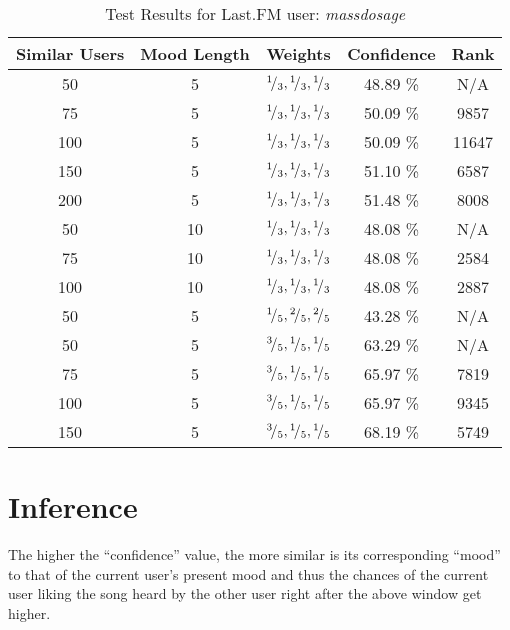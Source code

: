 \begin{table}[h!]
\centering
\begin{tabular}{ | c | c | c || c | c | }
\hline
Similar Users	& Mood Length	& Weights							&Confidence	&Rank\\
\hline \hline
50			& 5			& \({}^{1}\!/_{3}, {}^{1}\!/_{3}, {}^{1}\!/_{3}\)	&48.89 \%		&N/A\\
\hline
75			& 5			& \({}^{1}\!/_{3}, {}^{1}\!/_{3}, {}^{1}\!/_{3}\)	&50.09 \%		&9857\\
\hline
100			& 5			& \({}^{1}\!/_{3}, {}^{1}\!/_{3}, {}^{1}\!/_{3}\)	&50.09 \%		&11647\\
\hline
150			& 5			& \({}^{1}\!/_{3}, {}^{1}\!/_{3}, {}^{1}\!/_{3}\)	&51.10 \%		&6587\\
\hline
200			& 5			& \({}^{1}\!/_{3}, {}^{1}\!/_{3}, {}^{1}\!/_{3}\)	&51.48 \%		&8008\\
\hline
50			& 10			& \({}^{1}\!/_{3}, {}^{1}\!/_{3}, {}^{1}\!/_{3}\)	&48.08 \%		&N/A\\
\hline
75			& 10			& \({}^{1}\!/_{3}, {}^{1}\!/_{3}, {}^{1}\!/_{3}\)	&48.08 \%		&2584\\
\hline
100			& 10			& \({}^{1}\!/_{3}, {}^{1}\!/_{3}, {}^{1}\!/_{3}\)	&48.08 \%		&2887\\
\hline
50			& 5			& \({}^{1}\!/_{5}, {}^{2}\!/_{5}, {}^{2}\!/_{5}\)	&43.28 \%		&N/A\\
\hline
50			& 5			& \({}^{3}\!/_{5}, {}^{1}\!/_{5}, {}^{1}\!/_{5}\)	&63.29 \%		&N/A\\
\hline
75			& 5			& \({}^{3}\!/_{5}, {}^{1}\!/_{5}, {}^{1}\!/_{5}\)	&65.97 \%		&7819\\
\hline
100			& 5			& \({}^{3}\!/_{5}, {}^{1}\!/_{5}, {}^{1}\!/_{5}\)	&65.97 \%		&9345\\
\hline
150			& 5			& \({}^{3}\!/_{5}, {}^{1}\!/_{5}, {}^{1}\!/_{5}\)	&68.19 \%		&5749\\
\hline
\end{tabular}
\caption{Test Results for Last.FM user: \emph{massdosage}}
\label{table:test_results_massdosage}
\end{table}

	\section{Inference}
		The higher the ``confidence'' value, the more similar is its corresponding ``mood'' to that of the current user's present mood and thus the chances of the current user liking the song heard by the other user right after the above window get higher.
		
